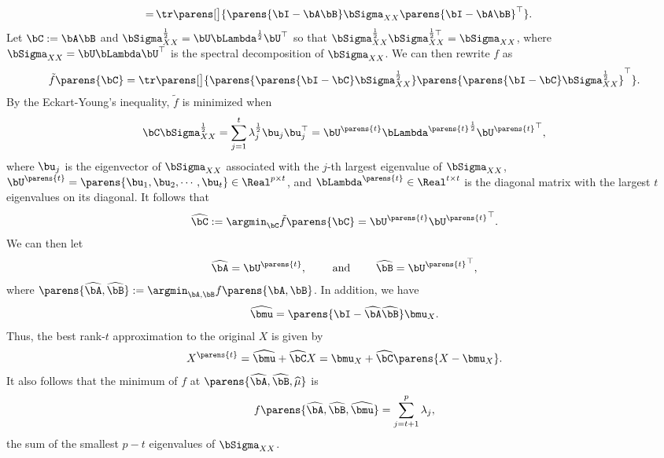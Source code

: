 \documentclass[12pt]{article}
\begin{document}
\begin{enumerate}[label=\textbf{\arabic*.}]
\begin{align*}
		= & \, \tr \parens[\big]{ \parens{\bI - \bA \bB} \bSigma_{XX} \parens{\bI - \bA \bB}^\top}. 
	\end{align*}
	Let $\bC := \bA \bB$ and $\bSigma_{XX}^{\frac{1}{2}} = \bU \bLambda^{\frac{1}{2}} \bU^\top$ so that $\bSigma_{XX}^{\frac{1}{2}} {\bSigma_{XX}^{\frac{1}{2} \top}} = \bSigma_{XX}$, where $\bSigma_{XX} = \bU \bLambda \bU^\top$ is the spectral decomposition of $\bSigma_{XX}$. We can then rewrite $f$ as 
	\begin{align*}
		\tilde{f} \parens{\bC} = \tr \parens[\big]{ \parens{\parens{\bI - \bC} \bSigma_{XX}^{\frac{1}{2}}} \parens{\parens{\bI - \bC} \bSigma_{XX}^{\frac{1}{2}}}^\top }. 
	\end{align*}
	By the Eckart-Young's inequality, $\tilde{f}$ is minimized when 
	\begin{align*}
		\bC \bSigma_{XX}^{\frac{1}{2}} = \sum_{j=1}^t \lambda_j^{\frac{1}{2}} \bu_j \bu_j^\top = \bU^{\parens{t}} {\bLambda^{\parens{t}}}^{\frac{1}{2}} {\bU^{\parens{t}}}^{\top}, 
	\end{align*}
	where $\bu_j$ is the eigenvector of $\bSigma_{XX}$ associated with the $j$-th largest eigenvalue of $\bSigma_{XX}$, $\bU^{\parens{t}} = \parens{\bu_1, \bu_2, \cdots, \bu_t} \in \Real^{p \times t}$, and $\bLambda^{\parens{t}} \in \Real^{t \times t}$ is the diagonal matrix with the largest $t$ eigenvalues on its diagonal. It follows that 
	\begin{align*}
		\widehat{\bC} := \argmin_{\bC} \tilde{f} \parens{\bC} = \bU^{\parens{t}} {\bU^{\parens{t}}}^{\top}. 
	\end{align*}
	We can then let 
	\begin{align*}
		\widehat{\bA} = \bU^{\parens{t}}, \qquad \text{ and } \qquad \widehat{\bB} = {\bU^{\parens{t}}}^{\top}, 
	\end{align*}
	where $\parens{\widehat{\bA}, \widehat{\bB}} := \argmin_{\bA, \bB} f \parens{\bA, \bB}$. In addition, we have 
	\begin{align*}
		\widehat{\bmu} = \parens{\bI - \widehat{\bA} \widehat{\bB}} \bmu_X. 
	\end{align*}
	Thus, the best rank-$t$ approximation to the original $X$ is given by 
	\begin{align*}
		X^{\parens{t}} = \widehat{\bmu} + \widehat{\bC} X = \bmu_X + \widehat{\bC} \parens{X - \bmu_X}. 
	\end{align*}
	It also follows that the minimum of $f$ at $\parens{\widehat{\bA}, \widehat{\bB}, \widehat{\mu}}$ is 
	\begin{align*}
		f \parens{\widehat{\bA}, \widehat{\bB}, \widehat{\bmu}} = \sum_{j=t+1}^p \lambda_j, 
	\end{align*}
	the sum of the smallest $p - t$ eigenvalues of $\bSigma_{XX}$. 
	

\end{enumerate}
\end{document}
